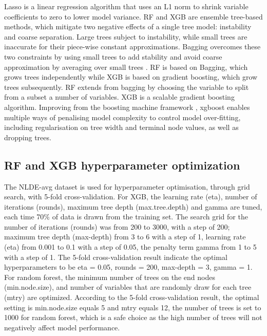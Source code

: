 \documentclass{article}
\begin{document}
Lasso is a linear regression algorithm that uses an L1 norm to shrink variable coefficients to zero to lower model variance. RF and XGB are ensemble tree-based methods, which mitigate two negative effects of a single tree model: instability and coarse separation. Large trees subject to instability, while small trees are inaccurate for their piece-wise constant approximations. Bagging overcomes these two constraints by using small trees to add stability and avoid coarse approximation by averaging over small trees \citep{friedman2001greedy}. RF is based on Bagging, which grows trees independently while XGB is based on gradient boosting, which grow trees subsequently. RF extends from bagging by choosing the variable to split from a subset a number of variables. XGB is a scalable gradient boosting algorithm. Improving from the boosting machine framework \cite{friedman2002stochastic}, xgboost enables multiple ways of penalising model complexity to control model over-fitting, including regularisation on tree width and terminal node values, as well as dropping trees.  



\subsection{RF and XGB hyperparameter optimization}
The NLDE-avg dataset is used for hyperparameter optimisation, through grid search, with 5-fold cross-validation. For XGB, the learning rate (eta), number of iterations (rounds), maximum tree depth (max.tree.depth) and gamma are tuned, each time 70\% of data is drawn from the training set. The search grid for the number of iterations (rounds) was from 200 to 3000, with a step of 200; maximum tree depth (max-depth) from 3 to 6 with a step of 1, learning rate (eta) from 0.001 to 0.1 with a step of 0.05, the penalty term gamma \citep{xgboost} from 1 to 5 with a step of 1. The 5-fold cross-validation result indicate the optimal hyperparameters to be eta = 0.05, rounds = 200, max-depth = 3, gamma = 1. For random forest, the minimum number of trees on the end nodes (min.node.size), and  number of variables that are randomly draw for each tree (mtry) are optimized. According to the 5-fold cross-validation result, the optimal setting is min.node.size equals 5 and mtry equals 12, the number of trees is set to 1000 for random forest, which is a safe choice as the high number of trees will not negatively affect model performance.
\end{document}
